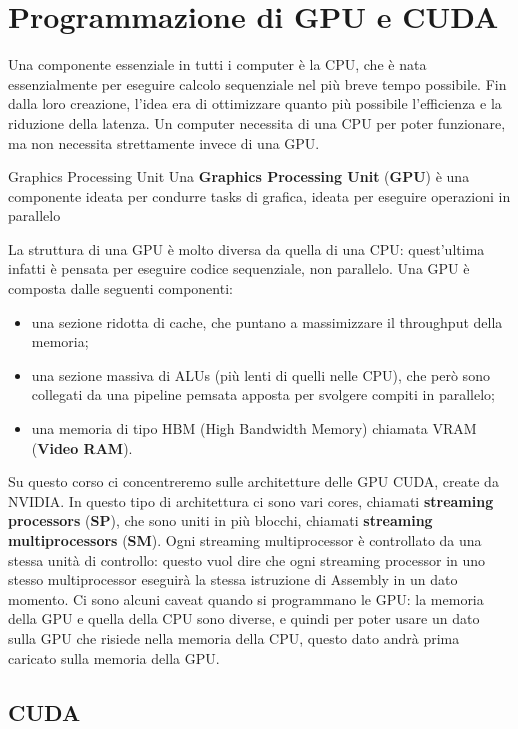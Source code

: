 \chapter{Programmazione di GPU e CUDA}

Una componente essenziale in tutti i computer è la CPU, che è nata essenzialmente per eseguire calcolo sequenziale nel più breve tempo possibile. Fin dalla loro creazione, l'idea era di ottimizzare quanto più possibile l'efficienza e la riduzione della latenza. Un computer necessita di una CPU per poter funzionare, ma non necessita strettamente invece di una GPU.

\begin{definition}{Graphics Processing Unit}
    Una \textbf{Graphics Processing Unit} (\textbf{GPU}) è una componente ideata per condurre tasks di grafica, ideata per eseguire operazioni in parallelo
\end{definition}

La struttura di una GPU è molto diversa da quella di una CPU: quest'ultima infatti è pensata per eseguire codice sequenziale, non parallelo. Una GPU è composta dalle seguenti componenti:
\begin{itemize}
    \item una sezione ridotta di cache, che puntano a massimizzare il throughput della memoria;
    \item una sezione massiva di ALUs (più lenti di quelli nelle CPU), che però sono collegati da una pipeline pemsata apposta per svolgere compiti in parallelo;
    \item una memoria di tipo HBM (High Bandwidth Memory) chiamata VRAM (\textbf{Video RAM}).
\end{itemize}

Su questo corso ci concentreremo sulle architetture delle GPU CUDA, create da NVIDIA. In questo tipo di architettura ci sono vari cores, chiamati \textbf{streaming processors} (\textbf{SP}), che sono uniti in più blocchi, chiamati \textbf{streaming multiprocessors} (\textbf{SM}). Ogni streaming multiprocessor è controllato da una stessa unità di controllo: questo vuol dire che ogni streaming processor in uno stesso multiprocessor eseguirà la stessa istruzione di Assembly in un dato momento.
\nl
Ci sono alcuni caveat quando si programmano le GPU: la memoria della GPU e quella della CPU sono diverse, e quindi per poter usare un dato sulla GPU che risiede nella memoria della CPU, questo dato andrà prima caricato sulla memoria della GPU.

\section{CUDA}

